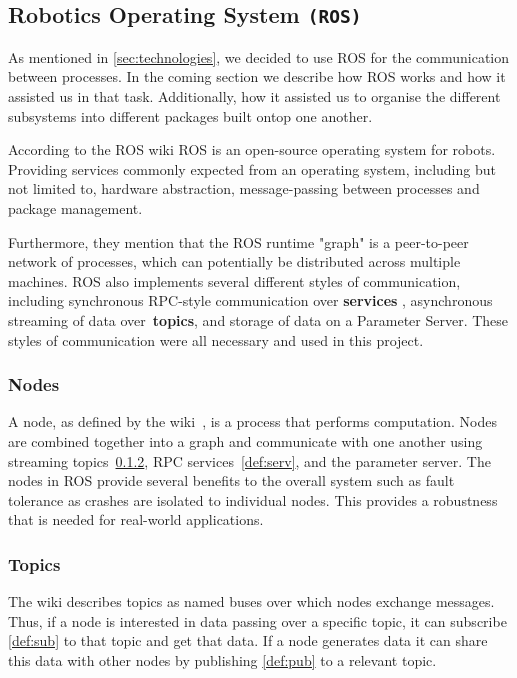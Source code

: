 \documentclass[bsc,frontabs,twoside,singlespacing,parskip,deptreport]{infthesis}     %
\begin{document}
\subsection{Robotics Operating System \texttt{(ROS)}}

As mentioned in \ref{sec:technologies}, we decided to use ROS for the communication between processes. In the coming section we describe how ROS works and how it assisted us in that task. Additionally, how it assisted us to organise the different subsystems into different packages built ontop one another. 

According to the ROS wiki \cite{roswiki} ROS is an open-source operating system for robots. Providing services commonly expected from an operating system, including but not limited to, hardware abstraction, message-passing between processes and package management. 

Furthermore, they mention that the ROS runtime "graph" is a peer-to-peer network of processes, which can potentially be distributed across multiple machines. ROS also implements several different styles of communication, including synchronous RPC-style communication over \textbf{services} , asynchronous streaming of data over~\textbf{topics}, and storage of data on a Parameter Server. These styles of communication were all necessary and used in this project. 

\subsubsection{Nodes}
\label{def:node}
A node, as defined by the wiki~\cite{roswiki}, is a process that performs computation. Nodes are combined together into a graph and communicate with one another using streaming topics~\ref{def:topic}, RPC services~\ref{def:serv}, and the parameter server. The nodes in ROS provide several benefits to the overall system such as fault tolerance as crashes are isolated to individual nodes. This provides a robustness that is needed for real-world applications.

\subsubsection{Topics}
\label{def:topic}
The wiki \cite{roswiki} describes topics as named buses over which nodes exchange messages. Thus, if a node is interested in data passing over a specific topic, it can subscribe \ref{def:sub} to that topic and get that data. If a node generates data it can share this data with other nodes by publishing \ref{def:pub} to a relevant topic. 
\end{document}
